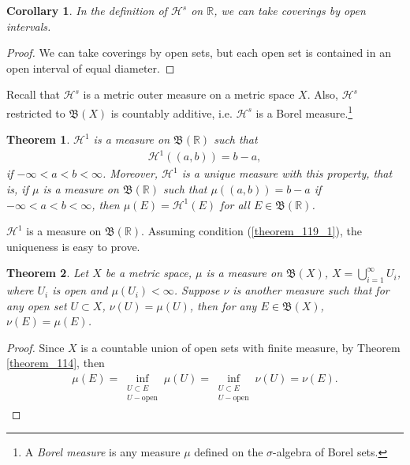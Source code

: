 \documentclass[11pt]{book}
\newtheorem{theorem}{Theorem}[chapter]
\newtheorem{corollary}{Corollary}[theorem]
\theoremstyle{definition}
\numberwithin{equation}{chapter}
\def\BB{\mathfrak{B}}
\def\H{{\mathcal H}}
\begin{document}
\medskip

\begin{corollary}\label{coro_15}
In the definition of $\H^s$ on $\mathbb{R}$, we can take coverings by open intervals.
\end{corollary}
\begin{proof}
We can take coverings by open sets, but each open set is contained in an open interval of equal diameter.
\end{proof}

\medskip

Recall that $\H^s$ is a metric outer measure on a metric space $X$. Also, $\H^s$ restricted to $\BB(X)$ is countably additive, i.e. $\H^s$ is a Borel measure.\footnote{A {\em Borel measure} is any measure $\mu$  defined on the $\sigma$-algebra of Borel sets\cite{4}.}

\medskip

\begin{theorem}\label{theorem_119}
$\H^1$ is a measure on $\BB(\mathbb{R})$ such that
\begin{align}\label{theorem_119_1}
    \H^1((a,b)) = b - a,
\end{align}
if $- \infty < a < b < \infty$. Moreover, $\H^1$ is a unique measure with this property, that is, if $\mu$ is a measure on $\BB(\mathbb{R})$ such that $\mu((a,b)) = b - a$ if $- \infty < a < b < \infty$, then $\mu(E) = \H^1(E)$ for all $E \in \BB(\mathbb{R})$.
\end{theorem}

\medskip

$\H^1$ is a measure on $\BB(\mathbb{R})$. Assuming condition (\ref{theorem_119_1}), the uniqueness is easy to prove. 

\medskip

\begin{theorem}\label{theorem_120}
Let $X$ be a metric space, $\mu$ is a measure on $\BB(X)$, $X = \bigcup^\infty_{i=1}U_i$, where $U_i$ is open and $\mu(U_i) < \infty$. Suppose $\nu$ is another measure such that for any open set $U \subset X$, $\nu(U) = \mu(U)$, then for any $E \in \BB(X)$, $\nu(E) = \mu(E)$.
\end{theorem}
\begin{proof}
Since $X$ is a countable union of open sets with finite measure, by Theorem \ref{theorem_114}, then
\begin{align*}
    \mu(E) = \inf_{\substack{U \subset E\\ U - \text{open}}} \mu(U) = \inf_{\substack{U \subset E\\ U - \text{open}}} \nu(U) = \nu(E).
\end{align*}
\end{proof}
\end{document}
